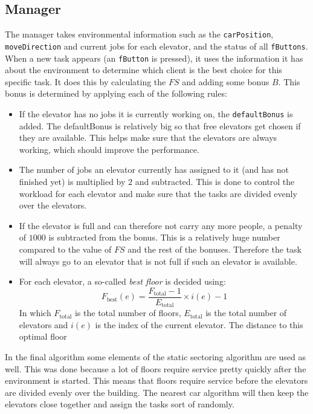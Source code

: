 \documentclass[a4paper,10pt,twocolumn]{article}
\begin{document}
\subsection{Manager}
The manager takes environmental information such as the \texttt{carPosition}, \texttt{moveDirection} and current jobs for each elevator, and the status of all \texttt{fButtons}. When a new task appears (an \texttt{fButton} is pressed), it uses the information it has about the environment to determine which client is the best choice for this specific task. It does this by calculating the $FS$ and adding some bonus $B$. This bonus is determined by applying each of the following rules:
\begin{itemize}
 \item If the elevator has no jobs it is currently working on, the \texttt{defaultBonus} is added. The defaultBonus is relatively big so that free elevators get chosen if they are available. This helps make sure that the elevators are always working, which should improve the performance.
 
 \item The number of jobs an elevator currently has assigned to it (and has not finished yet) is multiplied by $2$ and subtracted. This is done to control the workload for each elevator and make sure that the tasks are divided evenly over the elevators.
 
 \item If the elevator is full and can therefore not carry any more people, a penalty of $1000$ is subtracted from the bonus. This is a relatively huge number compared to the value of $FS$ and the rest of the bonuses. Therefore the task will always go to an elevator that is not full if such an elevator is available.
 
 \item For each elevator, a so-called \emph{best floor} is decided using:
 \begin{equation}
  F_\text{best} (e) = \frac{F_\text{total} - 1}{E_\text{total}} \times i(e) - 1
 \end{equation}
 In which $F_\text{total}$ is the total number of floors, $E_\text{total}$ is the total number of elevators and $i(e)$ is the index of the current elevator.
 The distance to this optimal floor

\end{itemize}




In the final algorithm some elements of the static sectoring algorithm are used as well. This was done because a lot of floors require service pretty quickly after the environment is started. This means that floors require service before the elevators are divided evenly over the building. The nearest car algorithm will then keep the elevators close together and assign the tasks sort of randomly.
\end{document}
